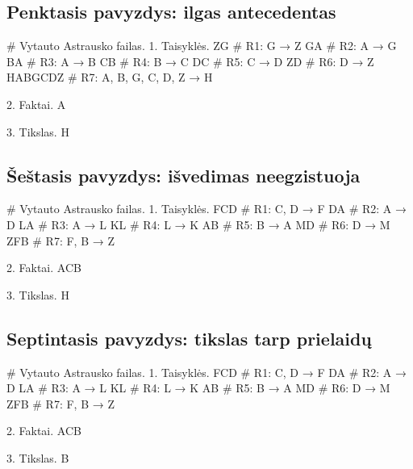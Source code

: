 \subsection{Penktasis pavyzdys: ilgas antecedentas}

\begin{pythonaienv}[bc]
# Vytauto Astrausko failas.
1. Taisyklės.
ZG                                      # R1: G → Z
GA                                      # R2: A → G
BA                                      # R3: A → B
CB                                      # R4: B → C
DC                                      # R5: C → D
ZD                                      # R6: D → Z
HABGCDZ                                 # R7: A, B, G, C, D, Z → H

2. Faktai.
A

3. Tikslas.
H
\end{pythonaienv}

\subsection{Šeštasis pavyzdys: išvedimas neegzistuoja}

\begin{pythonaienv}[bc]
# Vytauto Astrausko failas.
1. Taisyklės.
FCD                                     # R1: C, D → F
DA                                      # R2: A → D
LA                                      # R3: A → L
KL                                      # R4: L → K
AB                                      # R5: B → A
MD                                      # R6: D → M
ZFB                                     # R7: F, B → Z

2. Faktai.
ACB

3. Tikslas.
H
\end{pythonaienv}

\subsection{Septintasis pavyzdys: tikslas tarp prielaidų}

\begin{pythonaienv}[bc]
# Vytauto Astrausko failas.
1. Taisyklės.
FCD                                     # R1: C, D → F
DA                                      # R2: A → D
LA                                      # R3: A → L
KL                                      # R4: L → K
AB                                      # R5: B → A
MD                                      # R6: D → M
ZFB                                     # R7: F, B → Z

2. Faktai.
ACB

3. Tikslas.
B
\end{pythonaienv}

